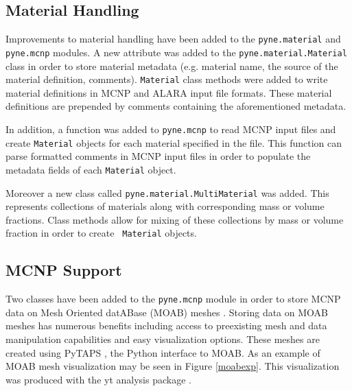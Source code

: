 \documentclass{ansconf}
\begin{document}
\subsection{Material Handling}

Improvements to material handling have been added to the \texttt{pyne.material}
and \texttt{pyne.mcnp} modules. A new attribute was added to the
\texttt{pyne.material.Material} class in order to store material metadata (e.g.
material name, the source of the material definition, comments).
\texttt{Material} class methods were added to write material definitions in MCNP
and ALARA \cite{wilson_alara:_1999} input file formats.  These material
definitions are prepended by comments containing the aforementioned metadata. 

In addition, a function was added to \texttt{pyne.mcnp} to read MCNP input files and
create \texttt{Material} objects for each material specified in the file. This
function can parse formatted comments in MCNP input files in order to
populate the metadata fields of each \texttt{Material} object.

Moreover a new class called \texttt{pyne.material.MultiMaterial} was added.  This
represents collections of materials along with corresponding mass or
volume fractions.  Class methods allow for mixing of these collections by mass
or volume fraction in order to create \texttt{ Material} objects.

\subsection{MCNP Support}

Two classes have been added to the \texttt{pyne.mcnp} module in order to store
MCNP data on Mesh Oriented datABase (MOAB) meshes \cite{tautges_moab:_2004}.
Storing data on MOAB meshes has numerous benefits including access to preexisting
mesh and data manipulation capabilities and easy visualization options. These
meshes are created using PyTAPS \cite{pytaps}, the Python interface to MOAB.
As an example of MOAB mesh visualization may be seen in Figure \ref{moabexp}.
This visualization was produced with the yt analysis package \cite{ytpaper}.
\end{document}

